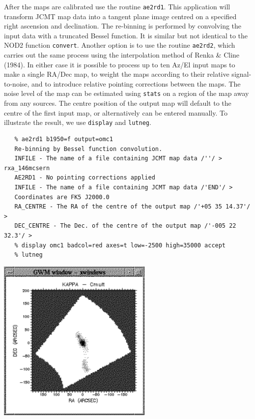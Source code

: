 \documentclass[11pt]{article}
\newcommand{\htmladdimg}[1]{}
\newenvironment{latexonly}{}{}
\newcommand{\htmlref}[2]{#1}
\newcommand{\xref}[3]{#1}
\begin{document}
   After the maps are calibrated use the routine
{\tt \xref{ae2rd1}{sun132}{AE2RD1}}.
   This application will transform JCMT map data into a tangent plane
   image centred on a specified right ascension and declination. The
   re-binning is performed by convolving the input data with a truncated
   Bessel function. It is similar but not identical to the NOD2 function
   {\tt convert}. Another option is to use the routine
{\tt \xref{ae2rd2}{sun132}{AE2RD2}},
   which carries out the same process using the interpolation method of
\htmlref{Renka \& Cline (1984).}{refer}
   In either case it is possible to process up to ten
   Az/El input maps to make a single RA/Dec map, to weight the maps according
   to their relative signal-to-noise, and to introduce relative pointing
   corrections between the maps. The noise level of the map can be
   estimated using
{\tt \xref{stats}{sun95}{STATS}}
   on a region of the map away from any
   sources. The centre position of the output map will default to the
   centre of the first input map, or alternatively can be entered
   manually. To illustrate
   the result, we use
{\tt \xref{display}{sun95}{DISPLAY}}
   and
{\tt \xref{lutneg}{sun95}{LUTNEG}}.

\begin{verbatim}
   % ae2rd1 b1950=f output=omc1
   Re-binning by Bessel function convolution.
   INFILE - The name of a file containing JCMT map data /''/ > rxa_146mcsern
   AE2RD1 - No pointing corrections applied
   INFILE - The name of a file containing JCMT map data /'END'/ >
   Coordinates are FK5 J2000.0
   RA_CENTRE - The RA of the centre of the output map /'+05 35 14.37'/ >
   DEC_CENTRE - The Dec. of the centre of the output map /'-005 22 32.3'/ >
   % display omc1 badcol=red axes=t low=-2500 high=35000 accept
   % lutneg
\end{verbatim}

\begin{latexonly}
\begin{center}
\leavevmode\includegraphics[height=80mm]{sc1_display5}
\end{center}
\end{latexonly}
\htmladdimg{addon/display5.gif}
\end{document}
